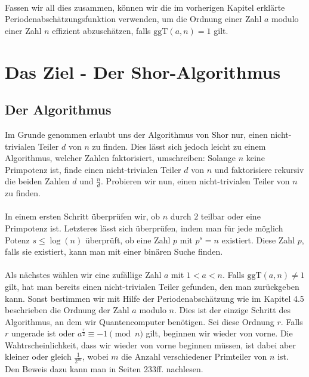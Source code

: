 \paragraph{}
Fassen wir all dies zusammen, können wir die im vorherigen Kapitel erklärte Periodenabschätzungsfunktion verwenden, um die Ordnung einer Zahl $a$ modulo einer Zahl $n$ effizient abzuschätzen, falls $\text{ggT}(a, n) = 1$ gilt.

\section{Das Ziel - Der Shor-Algorithmus}
\subsection{Der Algorithmus}
Im Grunde genommen erlaubt uns der Algorithmus von Shor nur, einen nicht-trivialen Teiler $d$ von $n$ zu finden. Dies lässt sich jedoch leicht zu einem Algorithmus, welcher Zahlen faktorisiert, umschreiben: Solange $n$ keine Primpotenz ist, finde einen nicht-trivialen Teiler $d$ von $n$ und faktorisiere rekursiv die beiden Zahlen $d$ und $\frac{n}{d}$. Probieren wir nun, einen nicht-trivialen Teiler von $n$ zu finden.

\paragraph{}
In einem ersten Schritt überprüfen wir, ob $n$ durch $2$ teilbar oder eine Primpotenz ist. Letzteres lässt sich überprüfen, indem man für jede möglich Potenz $s \leq \log(n)$ überprüft, ob eine Zahl $p$ mit $p^s = n$ existiert. Diese Zahl $p$, falls sie existiert, kann man mit einer binären Suche finden.
\paragraph{}
Als nächstes wählen wir eine zufällige Zahl $a$ mit $1 < a < n$. Falls $\text{ggT}(a, n) \neq 1$ gilt, hat man bereits einen nicht-trivialen Teiler gefunden, den man zurückgeben kann. Sonst bestimmen wir mit Hilfe der Periodenabschätzung wie im Kapitel 4.5 beschrieben die Ordnung der Zahl $a$ modulo $n$. Dies ist der einzige Schritt des Algorithmus, an dem wir Quantencomputer benötigen. Sei diese Ordnung $r$. Falls $r$ ungerade ist oder $a^\frac{r}{2} \equiv -1 \pmod{n}$ gilt, beginnen wir wieder von vorne. Die Wahtrscheinlichkeit, dass wir wieder von vorne beginnen müssen, ist dabei aber kleiner oder gleich $\frac{1}{2^m}$,  wobei $m$ die Anzahl verschiedener Primteiler von $n$ ist. Den Beweis dazu kann man in \cite{QC} Seiten 233ff. nachlesen.
